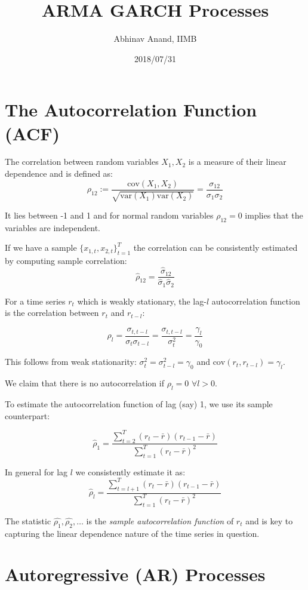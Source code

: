 \documentclass[11pt,]{article}
\title{ARMA GARCH Processes}
\author{Abhinav Anand, IIMB}
\date{2018/07/31}
\begin{document}
\maketitle

\section{The Autocorrelation Function
(ACF)}\label{the-autocorrelation-function-acf}

The correlation between random variables \(X_1, X_2\) is a measure of
their linear dependence and is defined as:
\[\rho_{12}:= \frac{\text{cov}(X_1,X_2)}{\sqrt{\text{var}(X_1)\text{var}(X_2)}}=\frac{\sigma_{12}}{\sigma_1\sigma_2}\]

It lies between -1 and 1 and for normal random variables \(\rho_{12}=0\)
implies that the variables are independent.

If we have a sample \(\{x_{1,t}, x_{2,t}\}_{t=1}^T\) the correlation can
be consistently estimated by computing sample correlation:
\[\hat{\rho}_{12}=\frac{\hat{\sigma}_{12}}{\hat{\sigma}_1\hat{\sigma}_2}\]

For a time series \(r_t\) which is weakly stationary, the lag-\(l\)
autocorrelation function is the correlation between \(r_t\) and
\(r_{t-l}\):

\[\rho_l=\frac{\sigma_{t,t-l}}{\sigma_t\sigma_{t-l}}=\frac{\sigma_{t,t-l}}{\sigma_t^2}
=\frac{\gamma_l}{\gamma_0}\]

This follows from weak stationarity:
\(\sigma^2_t=\sigma^2_{t-l}=\gamma_0\) and
\(\text{cov}(r_t,r_{t-l})=\gamma_l\).

We claim that there is no autocorrelation if \(\rho_l=0\)
\(\forall l>0\).

To estimate the autocorrelation function of lag (say) 1, we use its
sample counterpart:

\[\hat{\rho}_1=\frac{\sum_{t=2}^T (r_t-\bar{r})(r_{t-1}-\bar{r})}{\sum_{t=1}^T (r_t-\bar{r})^2}\]

In general for lag \(l\) we consistently estimate it as:
\[\hat{\rho}_l=\frac{\sum_{t=l+1}^T (r_t-\bar{r})(r_{t-1}-\bar{r})}{\sum_{t=1}^T (r_t-\bar{r})^2}\]

The statistic \(\hat{\rho_1},\hat{\rho_2},\hdots\) is the \emph{sample
autocorrelation function} of \(r_t\) and is key to capturing the linear
dependence nature of the time series in question.

\section{Autoregressive (AR)
Processes}\label{autoregressive-ar-processes}
\end{document}
